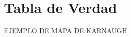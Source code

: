 \chapter{Tabla de Verdad}

EJEMPLO DE MAPA DE KARNAUGH
 \begin{center}
 \begin{Karnaughvuit}
\end{Karnaughvuit}
\end{center}